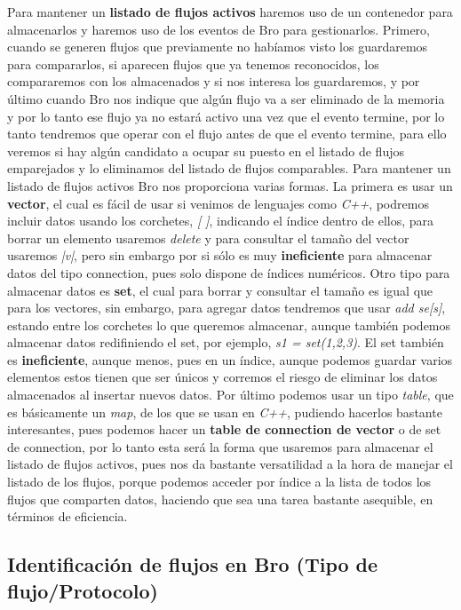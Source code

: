 Para mantener un \textbf{listado de flujos activos} haremos uso de un contenedor para 
almacenarlos y haremos uso de los eventos de Bro para gestionarlos. Primero, cuando 
se generen flujos que previamente no habíamos visto los guardaremos para compararlos, 
si aparecen flujos que ya tenemos reconocidos, los compararemos con los almacenados 
y si nos interesa los guardaremos, y por último cuando Bro nos indique que algún flujo 
va a ser eliminado de la memoria y por lo tanto ese flujo ya no estará activo una vez que el evento termine, por lo tanto tendremos que operar con el flujo antes de que el evento termine, para ello veremos 
si hay algún candidato a ocupar su puesto en el listado de flujos emparejados y lo 
eliminamos del listado de flujos comparables.
\intro
Para mantener un listado de flujos activos Bro nos proporciona varias formas. La 
primera es usar un \textbf{vector}, el cual es fácil de usar si venimos de lenguajes como \textit{C++}, 
podremos incluir datos usando los corchetes, \textit{[ ]}, indicando el índice dentro 
de ellos, para borrar un elemento usaremos \textit{delete} y para consultar el tamaño del 
vector usaremos \textit{|v|}, pero sin embargo por si sólo es muy \textbf{ineficiente} para almacenar 
datos del tipo connection, pues solo dispone de índices numéricos.
\intro
Otro tipo para almacenar datos es \textbf{set}, el cual para borrar y consultar el tamaño 
es igual que para los vectores, sin embargo, para agregar datos tendremos que usar \textit{add se[s]}, 
estando entre los corchetes lo que queremos almacenar, aunque también podemos 
almacenar datos redifiniendo el set, por ejemplo, \textit{s1 = set(1,2,3)}. El set también 
es \textbf{ineficiente}, aunque menos, pues en un índice, aunque podemos guardar varios 
elementos estos tienen que ser únicos y corremos el riesgo de eliminar los datos almacenados al insertar nuevos datos.
\intro
Por último podemos usar un tipo \textit{table}, que es básicamente un \textit{map}, de los que se 
usan en \textit{C++}, pudiendo hacerlos bastante interesantes, pues podemos hacer un \textbf{table 
de connection de vector} o de set de connection, por lo tanto esta será la forma 
que usaremos para almacenar el listado de flujos activos, pues nos da bastante 
versatilidad a la hora de manejar el listado de los flujos, porque podemos 
acceder por índice a la lista de todos los flujos que comparten datos, haciendo 
que sea una tarea bastante asequible, en términos de eficiencia.

\subsection{Identificación de flujos en Bro (Tipo de flujo/Protocolo)}

